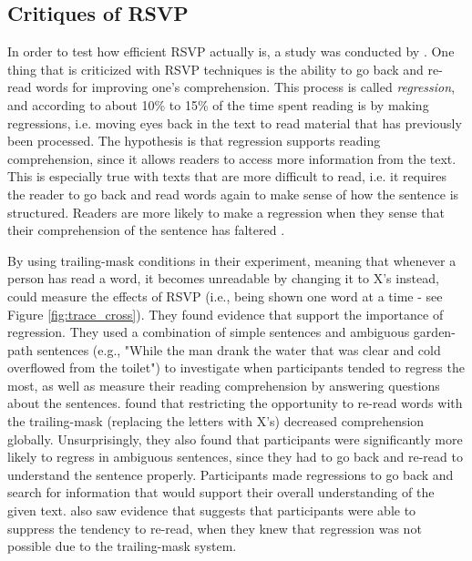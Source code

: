 \subsection{Critiques of RSVP}
In order to test how efficient RSVP actually is, a study was conducted by . One thing that is criticized with RSVP techniques is the ability to go back and re-read words for improving one's comprehension. This process is called \textit{regression}, and according to \citeauthor{schotter_dont_2014} about 10\% to 15\% of the time spent reading is by making regressions, i.e. moving eyes back in the text to read material that has previously been processed. The hypothesis is that regression supports reading comprehension, since it allows readers to access more information from the text. This is especially true with texts that are more difficult to read, i.e. it requires the reader to go back and read words again to make sense of how the sentence is structured. Readers are more likely to make a regression when they sense that their comprehension of the sentence has faltered \cite{schotter_dont_2014}.

By using trailing-mask conditions in their experiment, meaning that whenever a person has read a word, it becomes unreadable by changing it to X's instead,  could measure the effects of RSVP (i.e., being shown one word at a time - see Figure \ref{fig:trace_cross}). They found evidence that support the importance of regression. They used a combination of simple sentences and ambiguous garden-path sentences (e.g., "While
the man drank the water that was clear and cold overflowed from the toilet") to investigate when participants tended to regress the most, as well as measure their reading comprehension by answering questions about the sentences. \citeauthor{schotter_dont_2014} found that restricting the opportunity to re-read words with the trailing-mask (replacing the letters with X's) decreased comprehension globally. Unsurprisingly, they also found that participants were significantly more likely to regress in ambiguous sentences, since they had to go back and re-read to understand the sentence properly. Participants made regressions to go back and search for information that would support their overall understanding of the given text. \citeauthor{schotter_dont_2014} also saw evidence that suggests that participants were able to suppress the tendency to re-read, when they knew that regression was not possible due to the trailing-mask system.

